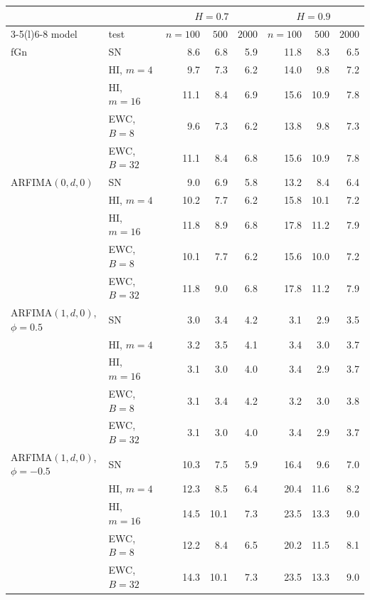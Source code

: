 \begin{tabular}{@{}llrrrrrr@{}}\toprule
& & \multicolumn{3}{c}{$H=0.7$} & \multicolumn{3}{c}{$H=0.9$}\\\cmidrule(lr){3-5}\cmidrule(l){6-8}
model & test & $n=100$ & $500$ & $2000$ & $n=100$ & $500$ & $2000$\\\midrule
fGn & SN & 8.6 & 6.8 & 5.9 & 11.8 & 8.3 & 6.5\\
 & HI, $m=4$ & 9.7 & 7.3 & 6.2 & 14.0 & 9.8 & 7.2\\
 & HI, $m=16$ & 11.1 & 8.4 & 6.9 & 15.6 & 10.9 & 7.8\\
 & EWC, $B=8$ & 9.6 & 7.3 & 6.2 & 13.8 & 9.8 & 7.3\\
 & EWC, $B=32$ & 11.1 & 8.4 & 6.8 & 15.6 & 10.9 & 7.8\\
\addlinespace
ARFIMA$(0,d,0)$ & SN & 9.0 & 6.9 & 5.8 & 13.2 & 8.4 & 6.4\\
 & HI, $m=4$ & 10.2 & 7.7 & 6.2 & 15.8 & 10.1 & 7.2\\
 & HI, $m=16$ & 11.8 & 8.9 & 6.8 & 17.8 & 11.2 & 7.9\\
 & EWC, $B=8$ & 10.1 & 7.7 & 6.2 & 15.6 & 10.0 & 7.2\\
 & EWC, $B=32$ & 11.8 & 9.0 & 6.8 & 17.8 & 11.2 & 7.9\\
\addlinespace
ARFIMA$(1,d,0)$, $\phi=0.5$ & SN & 3.0 & 3.4 & 4.2 & 3.1 & 2.9 & 3.5\\
 & HI, $m=4$ & 3.2 & 3.5 & 4.1 & 3.4 & 3.0 & 3.7\\
 & HI, $m=16$ & 3.1 & 3.0 & 4.0 & 3.4 & 2.9 & 3.7\\
 & EWC, $B=8$ & 3.1 & 3.4 & 4.2 & 3.2 & 3.0 & 3.8\\
 & EWC, $B=32$ & 3.1 & 3.0 & 4.0 & 3.4 & 2.9 & 3.7\\
\addlinespace
ARFIMA$(1,d,0)$, $\phi=-0.5$ & SN & 10.3 & 7.5 & 5.9 & 16.4 & 9.6 & 7.0\\
 & HI, $m=4$ & 12.3 & 8.5 & 6.4 & 20.4 & 11.6 & 8.2\\
 & HI, $m=16$ & 14.5 & 10.1 & 7.3 & 23.5 & 13.3 & 9.0\\
 & EWC, $B=8$ & 12.2 & 8.4 & 6.5 & 20.2 & 11.5 & 8.1\\
 & EWC, $B=32$ & 14.3 & 10.1 & 7.3 & 23.5 & 13.3 & 9.0\\
\bottomrule\end{tabular}
